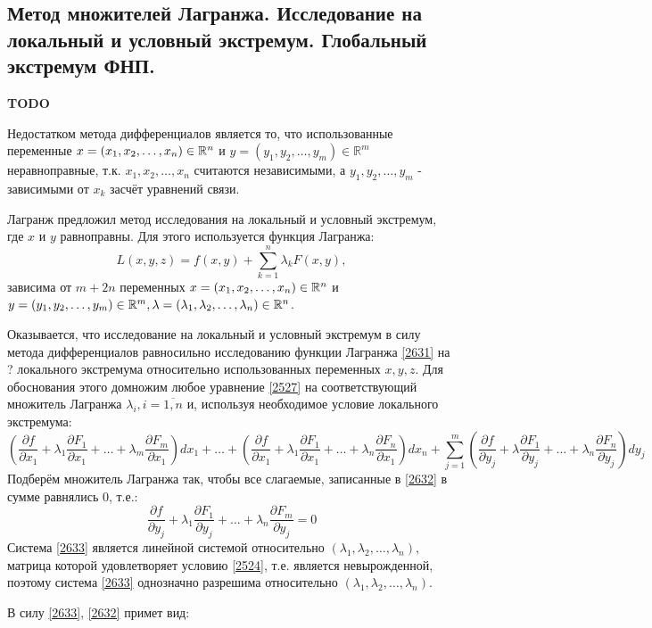 \subsection{Метод множителей Лагранжа. Исследование на локальный и условный экстремум. Глобальный экстремум ФНП.}
\textbf{TODO}

Недостатком метода дифференциалов является то, что использованные переменные $x = (x_1, x_2, \ldots, x_n) \in \mathbb{R}^n$ и $y = (y_1, y_2, \ldots, y_m) \in \mathbb{R}^m$ неравноправные, т.к. $x_1, x_2, \ldots, x_n$ считаются независимыми, а $y_1, y_2, \ldots, y_m$ - зависимыми от $x_k$ засчёт уравнений связи.

Лагранж предложил метод исследования на локальный и условный экстремум, где $x$ и $y$ равноправны. Для этого используется функция Лагранжа:
\begin{equation}
\label{2631}
L (x,y,z) = f(x,y) + \sum\limits_{k=1}^n \lambda_k F(x,y),
\end{equation}
зависима от $m + 2n$ переменных $x = (x_1, x_2, \ldots, x_n) \in \mathbb{R}^n$ и $y = (y_1, y_2, \ldots, y_m) \in \mathbb{R}^m, \lambda = (\lambda_1, \lambda_2, \ldots, \lambda_n) \in \mathbb{R}^n$.

Оказывается, что исследование на локальный и условный экстремум в силу метода дифференциалов равносильно исследованию функции Лагранжа \eqref{2631} на ? локального экстремума относительно использованных переменных $x, y, z$. Для обоснования этого домножим любое уравнение \eqref{2527} на соответствующий множитель Лагранжа $\lambda_i, i = \overline{1,n}$ и, используя необходимое условие локального экстремума:
\begin{equation}
\label{2632}
\left( \dfrac{\partial f}{\partial x_1} + \lambda_1 \dfrac{\partial F_1}{\partial x_1} + \ldots + \lambda_m \dfrac{\partial F_m}{\partial x_1}\right) dx_1 + \ldots + \left( \dfrac{\partial f}{\partial x_1} + \lambda_1 \dfrac{\partial F_1}{\partial x_1} + \ldots +  \lambda_n \dfrac{\partial F_n}{\partial x_1}\right) d x_n + \sum\limits_{j=1}^m \left( \dfrac{\partial f}{\partial y_j} + \lambda  \dfrac{\partial F_1}{\partial y_j} + \ldots + \lambda_n \dfrac{\partial F_n}{\partial y_j}\right) dy_j
\end{equation} 
Подберём множитель Лагранжа так, чтобы все слагаемые, записанные в \eqref{2632} в сумме равнялись 0, т.е.:
\begin{equation}
\label{2633}
\dfrac{\partial f}{\partial y_j} + \lambda_1 \dfrac{\partial F_1}{\partial y_j} + \ldots + \lambda_n \dfrac{\partial F_m}{\partial y_j} = 0
\end{equation}
Система \eqref{2633} является линейной системой относительно $(\lambda_1, \lambda_2, \ldots, \lambda_n)$, матрица которой удовлетворяет условию \eqref{2524}, т.е. является невырожденной, поэтому система \eqref{2633} однозначно разрешима относительно $(\lambda_1, \lambda_2, \ldots, \lambda_n)$.

В силу \eqref{2633}, \eqref{2632} примет вид: